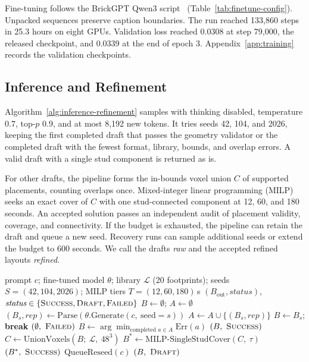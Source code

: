 \documentclass[letterpaper]{article} %
\begin{document}
Fine-tuning follows the BrickGPT Qwen3 script~\cite{brickgpt} (Table~\ref{tab:finetune-config}). Unpacked sequences preserve caption boundaries. The run reached 133,860 steps in 25.3 hours on eight GPUs. Validation loss reached 0.0308 at step 79,000, the released checkpoint, and 0.0339 at the end of epoch 3. Appendix~\ref{app:training} records the validation checkpoints.


\subsection{Inference and Refinement}
Algorithm~\ref{alg:inference-refinement} samples with thinking disabled, temperature $0.7$, top-$p$ $0.9$, and at most 8,192 new tokens. It tries seeds 42, 104, and 2026, keeping the first completed draft that passes the geometry validator or the completed draft with the fewest format, library, bounds, and overlap errors. A valid draft with a single stud component is returned as is.

For other drafts, the pipeline forms the in-bounds voxel union $C$ of supported placements, counting overlaps once. Mixed-integer linear programming (MILP) seeks an exact cover of $C$ with one stud-connected component at 12, 60, and 180 seconds. An accepted solution passes an independent audit of placement validity, coverage, and connectivity. If the budget is exhausted, the pipeline can retain the draft and queue a new seed. Recovery runs can sample additional seeds or extend the budget to 600 seconds. We call the drafts \emph{raw} and the accepted refined layouts \emph{refined}.
\begin{algorithm}[tb]
\caption{BrickForma inference and refinement}
\label{alg:inference-refinement}
\small
\begin{algorithmic}[1]
\REQUIRE prompt $c$; fine-tuned model $\theta$; library $\mathcal{L}$ (20 footprints); seeds $S=(42,104,2026)$; MILP tiers $T=(12,60,180)$\,s
\ENSURE $(B_{\mathrm{out}}, \textit{status})$, $\textit{status}\in\{\textsc{Success},\textsc{Draft},\textsc{Failed}\}$
\STATE $B \gets \emptyset$; $A \gets \emptyset$
  \STATE $(B_s,\textit{rep}) \gets \mathrm{Parse}(\theta.\mathrm{Generate}(c,\ \mathrm{seed}{=}s))$
  \STATE $A \gets A \cup \{(B_s,\textit{rep})\}$
    \STATE $B \gets B_s$; \textbf{break}
  \ENDIF
\ENDFOR
{}
    \RETURN $(\emptyset,\ \textsc{Failed})$
  \ENDIF
  \STATE $B \gets \arg\min_{\text{completed } a\in A} \mathrm{Err}(a)$
\ENDIF
{}
  \RETURN $(B,\ \textsc{Success})$ 
\ENDIF
\STATE $C \gets \mathrm{UnionVoxels}(B;\ \mathcal{L},\ 48^3)$ 
  \STATE $B^{*} \gets \mathrm{MILP\text{-}SingleStudCover}(C,\ \tau)$
    \RETURN $(B^{*},\ \textsc{Success})$
  \ENDIF
\ENDFOR
\STATE $\mathrm{QueueReseed}(c)$
\RETURN $(B,\ \textsc{Draft})$ 
\end{algorithmic}
\end{algorithm}
\end{document}
